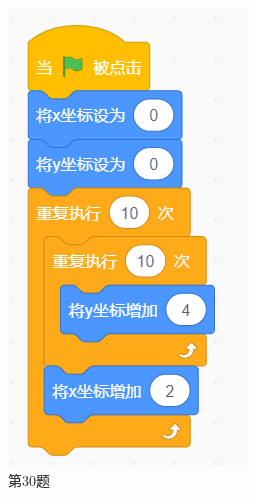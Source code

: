 \documentclass[10pt, a4paper]{article}
\begin{document}
\begin{enumerate}
\begin{figure}[htbp]
\begin{minipage}[t]{.12\textwidth}
                \includegraphics[width=\textwidth]{30.png}
                \caption*{第30题}
            \end{minipage}
            \begin{minipage}[t]{.2\textwidth}
                \centering
                \begin{minipage}[t]{.56\textwidth}

\end{minipage}
\end{minipage}
\end{figure}
\end{enumerate}
\end{document}
